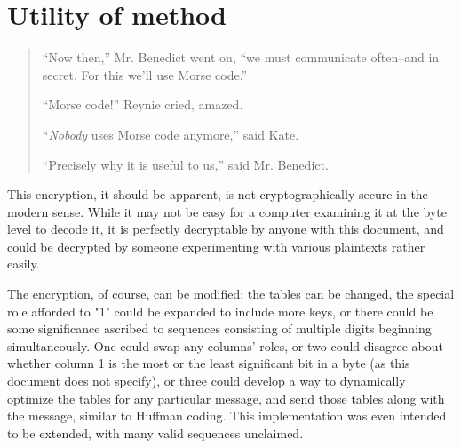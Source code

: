 \documentclass{article}
\begin{document}
\section{Utility of method}

\begin{quote}
``Now then,'' Mr. Benedict went on, ``we must communicate often--and in secret.  For this we'll use Morse code.''

``Morse code!'' Reynie cried, amazed.

``\textit{Nobody} uses Morse code anymore,'' said Kate.

``Precisely why it is useful to us,'' said Mr. Benedict.
\end{quote}

This encryption, it should be apparent, is not cryptographically secure in the modern sense.  While it may not be easy for a computer examining it at the byte level to decode it, it is perfectly decryptable by anyone with this document, and could be decrypted by someone experimenting with various plaintexts rather easily.

The encryption, of course, can be modified:  the tables can be changed, the special role afforded to "1" could be expanded to include more keys, or there could be some significance ascribed to sequences consisting of multiple digits beginning simultaneously.  One could swap any columns' roles, or two could disagree about whether column 1 is the most or the least significant bit in a byte (as this document does not specify), or three could develop a way to dynamically optimize the tables for any particular message, and send those tables along with the message, similar to Huffman coding.  This implementation was even intended to be extended, with many valid sequences unclaimed.
\end{document}
